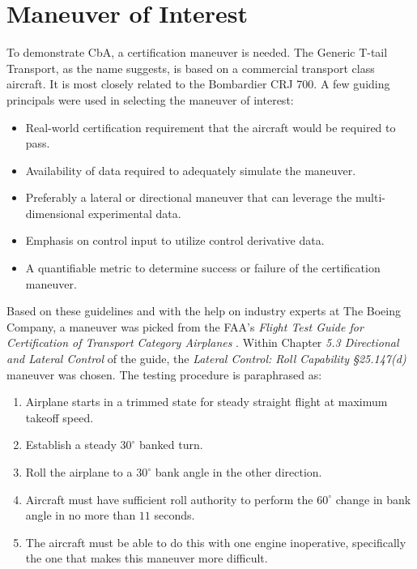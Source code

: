 \section{Maneuver of Interest} \label{sec:maneuver}

To demonstrate CbA, a certification maneuver is needed.
The Generic T-tail Transport, as the name suggests, is based on a commercial transport class aircraft.
It is most closely related to the Bombardier CRJ 700.
A few guiding principals were used in selecting the maneuver of interest:
\begin{itemize}
    \item Real-world certification requirement that the aircraft would be required to pass.
    \item Availability of data required to adequately simulate the maneuver.
    \item Preferably a lateral or directional maneuver that can leverage the multi-dimensional experimental data.
    \item Emphasis on control input to utilize control derivative data.
    \item A quantifiable metric to determine success or failure of the certification maneuver.
\end{itemize}

Based on these guidelines and with the help on industry experts at The Boeing Company, a maneuver was picked from the FAA's \textit{Flight Test Guide for Certification of Transport Category Airplanes} \cite{romanowski_flight_2018}.
Within Chapter \textit{5.3 Directional and Lateral Control} of the guide, the \textit{Lateral Control: Roll Capability \S 25.147(d)} maneuver was chosen.   
The testing procedure is paraphrased as: 
\begin{enumerate}
    \item Airplane starts in a trimmed state for steady straight flight at maximum takeoff speed.
    \item Establish a steady $30^\circ$ banked turn.
    \item Roll the airplane to a $30^\circ$ bank angle in the other direction.
    \item Aircraft must have sufficient roll authority to perform the $60^\circ$ change in bank angle in no more than $11$ seconds. 
    \item The aircraft must be able to do this with one engine inoperative, specifically the one that makes this maneuver more difficult.

\end{enumerate}

